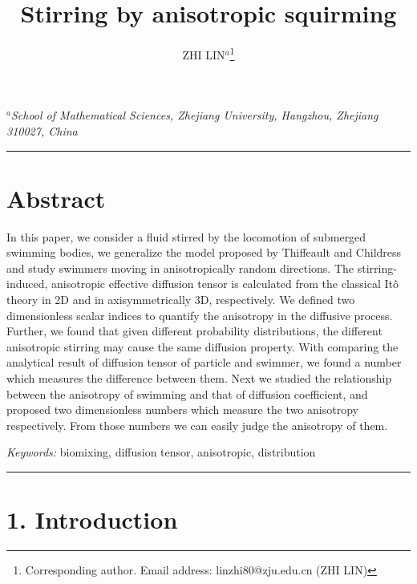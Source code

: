 \documentclass[12pt,a4paper]{article}
\begin{document}
\title{\textbf{Stirring by anisotropic squirming}\vspace{0.5em}}
\author{ZHI LIN$^{a}$\thanks{Corresponding author. Email address: linzhi80@zju.edu.cn (ZHI LIN)}\vspace{-2em}}
\date{\vspace{-3em}}
\maketitle
\begin{center}
  \small\textsl{$^{a}$School of Mathematical Sciences, Zhejiang University,
    Hangzhou, Zhejiang 310027, China}\\[50pt]
\end{center}
\rule[0.25\baselineskip]{\textwidth}{1pt}

\section*{\normalsize{Abstract}}

\noindent
In this paper,
we consider a fluid stirred by the locomotion of submerged swimming bodies,
we generalize the model proposed by Thiffeault and Childress\cite{Stirr}
and study swimmers moving in anisotropically random directions.
The stirring-induced, anisotropic effective diffusion tensor is calculated
from the classical It\^o theory in 2D and in axisymmetrically 3D,
respectively. We defined two dimensionless scalar indices to
quantify the anisotropy in the diffusive process.
Further, we found that given different probability distributions,
the different anisotropic stirring may cause the same diffusion property.
With comparing the analytical result of diffusion tensor of particle and swimmer,
we found a number which measures the difference between them.
Next we studied the relationship between the anisotropy of swimming and that of diffusion coefficient,
and proposed two dimensionless numbers which measure the two anisotropy respectively. From those numbers we can easily judge the anisotropy of them.\vspace{0.75em}

\noindent
\textsl{Keywords:} biomixing, diffusion tensor, anisotropic,
distribution\vspace{0.75em}

\noindent
\rule[0.25\baselineskip]{\textwidth}{1pt}

\section*{\normalsize{1. Introduction}}
\end{document}
